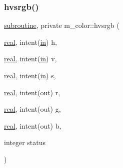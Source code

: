 \subsubsection{\texorpdfstring{hvsrgb()}{hvsrgb()}}
{\footnotesize\ttfamily \hyperlink{M__stopwatch_83_8txt_acfbcff50169d691ff02d4a123ed70482}{subroutine}, private m\+\_\+color\+::hvsrgb (\begin{DoxyParamCaption}\item[{\hyperlink{read__watch_83_8txt_abdb62bde002f38ef75f810d3a905a823}{real}, intent(\hyperlink{M__journal_83_8txt_afce72651d1eed785a2132bee863b2f38}{in})}]{h,  }\item[{\hyperlink{read__watch_83_8txt_abdb62bde002f38ef75f810d3a905a823}{real}, intent(\hyperlink{M__journal_83_8txt_afce72651d1eed785a2132bee863b2f38}{in})}]{v,  }\item[{\hyperlink{read__watch_83_8txt_abdb62bde002f38ef75f810d3a905a823}{real}, intent(\hyperlink{M__journal_83_8txt_afce72651d1eed785a2132bee863b2f38}{in})}]{s,  }\item[{\hyperlink{read__watch_83_8txt_abdb62bde002f38ef75f810d3a905a823}{real}, intent(out)}]{r,  }\item[{\hyperlink{read__watch_83_8txt_abdb62bde002f38ef75f810d3a905a823}{real}, intent(out)}]{g,  }\item[{\hyperlink{read__watch_83_8txt_abdb62bde002f38ef75f810d3a905a823}{real}, intent(out)}]{b,  }\item[{integer}]{status }\end{DoxyParamCaption})\hspace{0.3cm}{\ttfamily [private]}}


